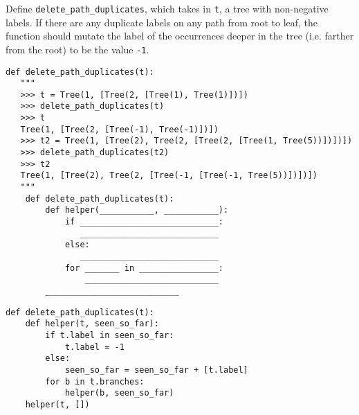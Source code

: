 \begin{blocksection}
\question
Define \texttt{delete\_path\_duplicates}, which takes in \texttt{t}, a tree
with non-negative labels. If there are any duplicate labels on any path 
from root to leaf, the function should mutate the label of the occurrences
deeper in the tree (i.e. farther from the root) to be the value \texttt{-1}.

\begin{lstlisting}
def delete_path_duplicates(t):
   """
   >>> t = Tree(1, [Tree(2, [Tree(1), Tree(1)])])
   >>> delete_path_duplicates(t)
   >>> t
   Tree(1, [Tree(2, [Tree(-1), Tree(-1)])])
   >>> t2 = Tree(1, [Tree(2), Tree(2, [Tree(2, [Tree(1, Tree(5))])])])
   >>> delete_path_duplicates(t2)
   >>> t2
   Tree(1, [Tree(2), Tree(2, [Tree(-1, [Tree(-1, Tree(5))])])])
   """
    def delete_path_duplicates(t):
        def helper(___________, ___________):
            if ____________________________:
               ____________________________
            else:
               ____________________________
            for _______ in ________________:
                ___________________________
        ___________________________

\end{lstlisting}

\begin{solution}
\begin{lstlisting}
def delete_path_duplicates(t):
    def helper(t, seen_so_far):
        if t.label in seen_so_far:
            t.label = -1
        else:
            seen_so_far = seen_so_far + [t.label]
        for b in t.branches:
            helper(b, seen_so_far)
    helper(t, [])
\end{lstlisting}
\end{solution}
\end{blocksection}